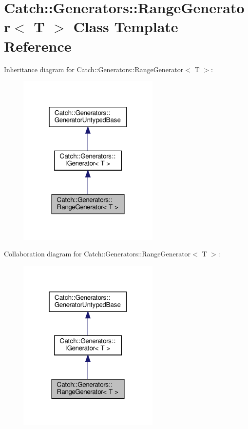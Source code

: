 \hypertarget{classCatch_1_1Generators_1_1RangeGenerator}{}\section{Catch\+:\+:Generators\+:\+:Range\+Generator$<$ T $>$ Class Template Reference}
\label{classCatch_1_1Generators_1_1RangeGenerator}


Inheritance diagram for Catch\+:\+:Generators\+:\+:Range\+Generator$<$ T $>$\+:
\nopagebreak
\begin{figure}[H]
\begin{center}
\leavevmode
\includegraphics[width=199pt]{classCatch_1_1Generators_1_1RangeGenerator__inherit__graph}
\end{center}
\end{figure}


Collaboration diagram for Catch\+:\+:Generators\+:\+:Range\+Generator$<$ T $>$\+:
\nopagebreak
\begin{figure}[H]
\begin{center}
\leavevmode
\includegraphics[width=199pt]{classCatch_1_1Generators_1_1RangeGenerator__coll__graph}
\end{center}
\end{figure}
